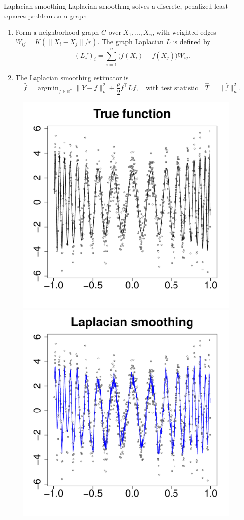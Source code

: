 \documentclass[xcolor=dvipsnames]{beamer}
\newcommand{\Reals}{\mathbb{R}}
\newcommand{\wh}[1]{\widehat{#1}}
\DeclareMathOperator*{\argmin}{argmin}
\begin{document}
\begin{frame}{Laplacian smoothing}
Laplacian smoothing solves a discrete, penalized least squares problem on a graph.
\begin{enumerate}
	\item  Form a \alert{neighborhood graph} $G$ over $X_1,\ldots,X_n$, with weighted edges $W_{ij} = K(\|X_i - X_j\|/r)$. The \alert{graph Laplacian} $L$ is defined by
	\begin{equation*}
	(Lf)_i = \sum_{i = 1}^{n} \bigl(f(X_i) - f(X_j)\bigr) W_{ij}.
	\end{equation*}
	\item The \alert{Laplacian smoothing} estimator is
	\begin{equation*}
	\wh{f} = \argmin_{f \in \Reals^n} \|Y - f\|_n^2 + \frac{\rho}{2} f^{\top} L f,\quad\textrm{with test statistic}\quad\wh{T} = \|\wh{f}\|_n^2. 
	\end{equation*}
\end{enumerate}
\begin{figure}
	\centering
	\includegraphics[width=.25\textwidth]{figures/wiggly_cosine/regression_function_1.pdf}
	\includegraphics[width=.25\textwidth]{figures/wiggly_cosine/laplacian_smoothing_estimate_1.pdf} 
\end{figure}
\end{frame}
\end{document}
